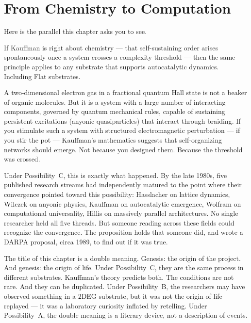 
\section*{From Chemistry to Computation}
\label{spine:gen-from-chemistry-to-computation}

Here is the parallel this chapter asks you to see.

If Kauffman is right about chemistry --- that self-sustaining order arises spontaneously once a system crosses a complexity threshold --- then the same principle applies to any substrate that supports autocatalytic dynamics. Including Flat substrates.

A two-dimensional electron gas in a fractional quantum Hall state is not a beaker of organic molecules. But it is a system with a large number of interacting components, governed by quantum mechanical rules, capable of sustaining persistent excitations (anyonic quasiparticles) that interact through braiding. If you stimulate such a system with structured electromagnetic perturbation --- if you stir the pot --- Kauffman's mathematics suggests that self-organizing networks should emerge. Not because you designed them. Because the threshold was crossed.

Under Possibility~C, this is exactly what happened. By the late 1980s, five published research streams had independently matured to the point where their convergence pointed toward this possibility: Hasslacher on lattice dynamics, Wilczek on anyonic physics, Kauffman on autocatalytic emergence, Wolfram on computational universality, Hillis on massively parallel architectures. No single researcher held all five threads. But someone reading across these fields could recognize the convergence. The proposition holds that someone did, and wrote a DARPA proposal, circa 1989, to find out if it was true.

The title of this chapter is a double meaning. Genesis: the origin of the project. And genesis: the origin of life. Under Possibility~C, they are the same process in different substrates. Kauffman's theory predicts both. The conditions are not rare. And they can be duplicated. Under Possibility~B, the researchers may have observed something in a 2DEG substrate, but it was not the origin of life replayed --- it was a laboratory curiosity inflated by retelling. Under Possibility~A, the double meaning is a literary device, not a description of events.

